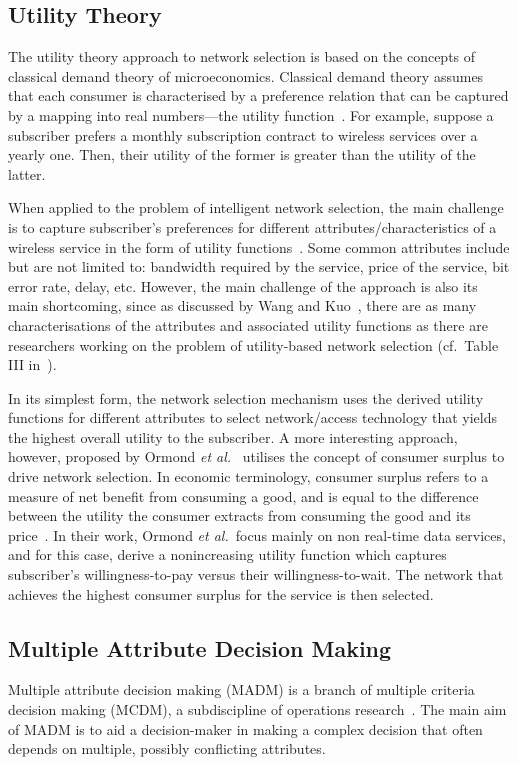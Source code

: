 \subsection{Utility Theory} %
\label{sub:utility_theory_intelligent}
The utility theory approach to network selection is based on the concepts of classical demand theory of microeconomics. Classical demand theory assumes that each consumer is characterised by a preference relation that can be captured by a mapping into real numbers---the utility function~\cite{MicroTheory}. For example, suppose a subscriber prefers a monthly subscription contract to wireless services over a yearly one. Then, their utility of the former is greater than the utility of the latter.

When applied to the problem of intelligent network selection, the main challenge is to capture subscriber's preferences for different attributes/characteristics of a wireless service in the form of utility functions~\cite{LushengKuo2013}. Some common attributes include but are not limited to: bandwidth required by the service, price of the service, bit error rate, delay, etc. However, the main challenge of the approach is also its main shortcoming, since as discussed by Wang and Kuo~\cite{LushengKuo2013}, there are as many characterisations of the attributes and associated utility functions as there are researchers working on the problem of utility-based network selection (cf.~Table III in~\cite{LushengKuo2013}).

In its simplest form, the network selection mechanism uses the derived utility functions for different attributes to select network/access technology that yields the highest overall utility to the subscriber. A more interesting approach, however, proposed by Ormond \emph{et al.}~\cite{OrmondCS106,OrmondCS206,OrmondCS306} utilises the concept of consumer surplus to drive network selection. In economic terminology, consumer surplus refers to a measure of net benefit from consuming a good, and is equal to the difference between the utility the consumer extracts from consuming the good and its price~\cite{MicroTheory,Varian2010,Varian1992}. In their work, Ormond \emph{et al.}~focus mainly on non real-time data services, and for this case, derive a nonincreasing utility function which captures subscriber's willingness-to-pay versus their willingness-to-wait. The network that achieves the highest consumer surplus for the service is then selected.

\subsection{Multiple Attribute Decision Making} %
\label{sub:multiple_attribute_decision_making_intelligent}
Multiple attribute decision making (MADM) is a branch of multiple criteria decision making (MCDM), a subdiscipline of operations research~\cite{LushengKuo2013}. The main aim of MADM is to aid a decision-maker in making a complex decision that often depends on multiple, possibly conflicting attributes.

